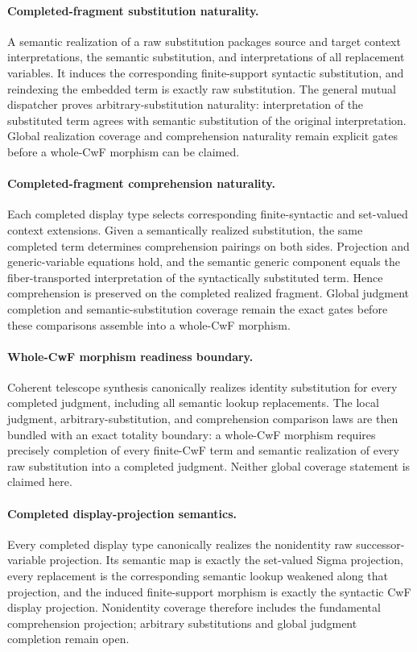\documentclass[11pt]{article}
\theoremstyle{definition}
\begin{document}
\paragraph{Completed-fragment substitution naturality.}
A semantic realization of a raw substitution packages source and target
context interpretations, the semantic substitution, and interpretations of
all replacement variables. It induces the corresponding finite-support
syntactic substitution, and reindexing the embedded term is exactly raw
substitution. The general mutual dispatcher proves arbitrary-substitution
naturality: interpretation of the substituted term agrees with semantic
substitution of the original interpretation. Global realization coverage and
comprehension naturality remain explicit gates before a whole-CwF morphism can
be claimed.

\paragraph{Completed-fragment comprehension naturality.}
Each completed display type selects corresponding finite-syntactic and
set-valued context extensions. Given a semantically realized substitution, the
same completed term determines comprehension pairings on both sides. Projection
and generic-variable equations hold, and the semantic generic component equals
the fiber-transported interpretation of the syntactically substituted term.
Hence comprehension is preserved on the completed realized fragment. Global
judgment completion and semantic-substitution coverage remain the exact gates
before these comparisons assemble into a whole-CwF morphism.

\paragraph{Whole-CwF morphism readiness boundary.}
Coherent telescope synthesis canonically realizes identity substitution for
every completed judgment, including all semantic lookup replacements. The
local judgment, arbitrary-substitution, and comprehension comparison laws are
then bundled with an exact totality boundary: a whole-CwF morphism requires
precisely completion of every finite-CwF term and semantic realization of every
raw substitution into a completed judgment. Neither global coverage statement
is claimed here.

\paragraph{Completed display-projection semantics.}
Every completed display type canonically realizes the nonidentity raw
successor-variable projection. Its semantic map is exactly the set-valued Sigma
projection, every replacement is the corresponding semantic lookup weakened
along that projection, and the induced finite-support morphism is exactly the
syntactic CwF display projection. Nonidentity coverage therefore includes the
fundamental comprehension projection; arbitrary substitutions and global
judgment completion remain open.
\end{document}
